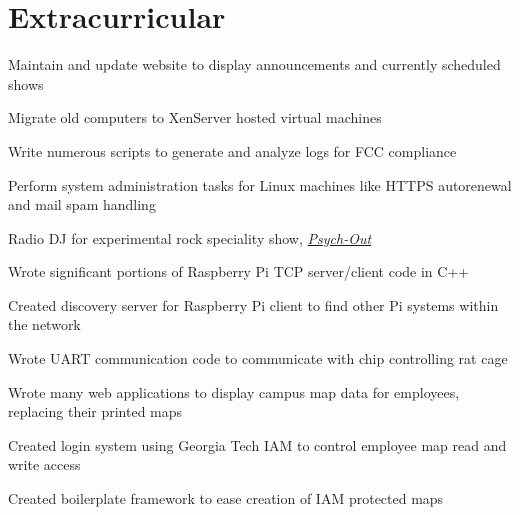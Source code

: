 \documentclass[line]{resume}
\begin{document}
\section{Extracurricular}
\begin{myitemize}
	\item Maintain and update website to display announcements and currently scheduled shows 
	\item Migrate old computers to XenServer hosted virtual machines
	\item Write numerous scripts to generate and analyze logs for FCC compliance
	\item Perform system administration tasks for Linux machines like HTTPS autorenewal and mail spam handling
	\item Radio DJ for experimental rock speciality show, \href{https://www.wrek.org/psychout/}{\textit{Psych-Out}} 
\end{myitemize}

\begin{myitemize}
	\item Wrote significant portions of Raspberry Pi TCP server/client code in C++ 
	\item Created discovery server for Raspberry Pi client to find other Pi systems within the network 
	\item Wrote UART communication code to communicate with chip controlling rat cage 
\end{myitemize}

\begin{myitemize}
	\item Wrote many web applications to display campus map data for employees, replacing their printed maps
	\item Created login system using Georgia Tech IAM to control employee map read and write access 
	\item Created boilerplate framework to ease creation of IAM protected maps 
\end{myitemize}
\end{document}
